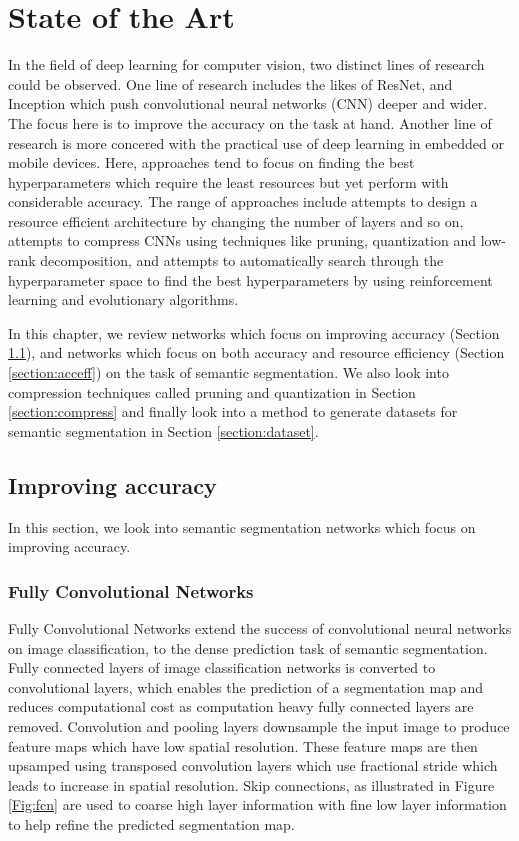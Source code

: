 
\chapter{State of the Art}

In the field of deep learning for computer vision, two distinct lines of research could be observed. One line of research includes the likes of ResNet, and Inception which push convolutional neural networks (CNN) deeper and wider. The focus here is to improve the accuracy on the task at hand. Another line of research is more concered with the practical use of deep learning in embedded or mobile devices. Here, approaches tend to focus on finding the best hyperparameters which require the least resources but yet perform with considerable accuracy. The range of approaches include attempts to design a resource efficient architecture by changing the number of layers and so on, attempts to compress CNNs using techniques like pruning, quantization and low-rank decomposition, and attempts to automatically search through the hyperparameter space to find the best hyperparameters by using reinforcement learning and evolutionary algorithms. 

In this chapter, we review networks which focus on improving accuracy (Section \ref{section:impacc}), and networks which focus on both accuracy and resource efficiency (Section \ref{section:acceff}) on the task of semantic segmentation. We also look into compression techniques called pruning and quantization in Section \ref{section:compress} and finally look into a method to generate datasets for semantic segmentation in Section \ref{section:dataset}.


\section{Improving accuracy}
\label{section:impacc}

In this section, we look into semantic segmentation networks which focus on improving accuracy. 

\subsection{Fully Convolutional Networks}

Fully Convolutional Networks \cite{DBLP:journals/corr/LongSD14} extend the success of convolutional neural networks on image classification, to the dense prediction task of semantic segmentation. Fully connected layers of image classification networks is converted to convolutional layers, which enables the prediction of a segmentation map and reduces computational cost as computation heavy fully connected layers are removed. Convolution and pooling layers downsample the input image to produce feature maps which have low spatial resolution. These feature maps are then upsamped using transposed convolution layers which use fractional stride which leads to increase in spatial resolution. Skip connections, as illustrated in Figure \ref{Fig:fcn} are used to coarse high layer information with fine low layer information to help refine the predicted segmentation map. 

